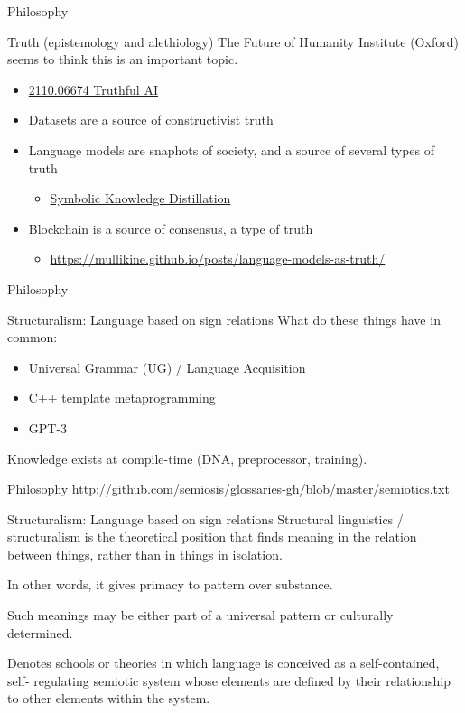 \documentclass[presentation]{beamer}
\begin{document}
\begin{frame}[label={sec:org6beb98e}]{Philosophy}
\begin{block}{Truth (epistemology and alethiology)}
The Future of Humanity Institute (Oxford)
seems to think this is an important topic.

\begin{itemize}
\item \href{https://arxiv.org/abs/2110.06674}{ 2110.06674  Truthful AI}
\item Datasets are a source of constructivist truth
\item Language models are snaphots of society, and a source of several types of truth
\begin{itemize}
\item \href{https://www.youtube.com/watch?v=kP-dXK9JEhY}{Symbolic Knowledge Distillation}
\end{itemize}
\item Blockchain is a source of consensus, a type of truth
\begin{itemize}
\item \url{https://mullikine.github.io/posts/language-models-as-truth/}
\end{itemize}
\end{itemize}
\end{block}
\end{frame}

\begin{frame}[label={sec:orgb1b9331}]{Philosophy}
\begin{block}{Structuralism: Language based on sign relations}
What do these things have in common:
\begin{itemize}
\item Universal Grammar (UG) / Language Acquisition
\item C++ template metaprogramming
\item GPT-3
\end{itemize}

Knowledge exists at compile-time (DNA, preprocessor, training).
\end{block}
\end{frame}

\begin{frame}[label={sec:org6a1b962}]{Philosophy}
\url{http://github.com/semiosis/glossaries-gh/blob/master/semiotics.txt}

\begin{block}{Structuralism: Language based on sign relations}
Structural linguistics / structuralism is the
theoretical position that finds meaning in the
relation between things, rather than in things
in isolation.

In other words, it gives primacy to pattern
over substance.

Such meanings may be either part of a
universal pattern or culturally determined.

Denotes schools or theories in which language
is conceived as a self-contained, self-
regulating semiotic system whose elements are
defined by their relationship to other
elements within the system.
\end{block}
\end{frame}
\end{document}
